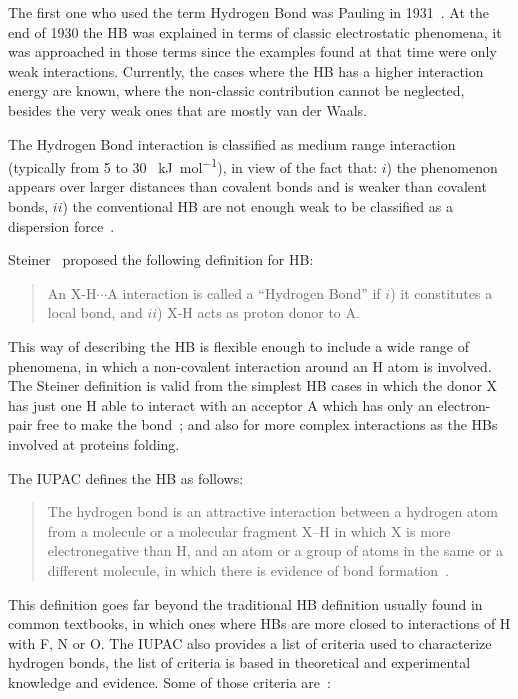 The first one who used the term Hydrogen Bond was Pauling in
1931~\citep{gilli}.  At the end of 1930 the HB was explained in terms of
classic electrostatic phenomena, it was approached in those terms since the
examples found at that time were only weak interactions. Currently, the cases
where the HB has a higher interaction energy are known, where the non-classic
contribution cannot be neglected, besides the very weak ones that are mostly
van der Waals.

The Hydrogen Bond interaction is classified as medium range interaction
(typically from 5 to 30 \SI{}{\kilo \joule \per \mole}), in view of the fact
that: $i$) the phenomenon appears over larger distances than covalent bonds and
is weaker than covalent bonds, $ii$) the conventional HB are not enough weak to
be classified as a dispersion force~\cite{chang}.

Steiner~\cite{steiner} proposed the following definition for HB:

\begin{quote} 
  An X-H$\cdots$A interaction is called a ``Hydrogen Bond'' if $i$) it
  constitutes a local bond, and $ii$) X-H acts as proton donor to A.
\end{quote}

\noindent This way of describing the HB is flexible enough to include a wide
range of phenomena, in which a non-covalent interaction around an H atom is
involved. The Steiner definition is valid from the simplest HB cases in which
the donor X has just one H able to interact with an acceptor A which has only
an electron-pair free to make the bond~\cite{scheiner}; and also for more
complex interactions as the HBs involved at proteins folding.

The \gls{IUPAC} defines the HB as follows:

\begin{quote}
The hydrogen bond is an attractive interaction between a hydrogen atom from a
molecule or a molecular fragment X–H in which X is more electronegative than H,
and an atom or a group of atoms in the same or a different molecule, in which
there is evidence of bond formation~\cite{iupac}.
\end{quote}

This definition goes far beyond the traditional HB definition usually found in
common textbooks, in which ones where HBs are more closed to interactions of H
with F, N or O. The IUPAC also provides a list of criteria used to characterize
hydrogen bonds, the list of criteria is based in theoretical and experimental
knowledge and evidence. Some of those criteria are~\citep{iupac}:

